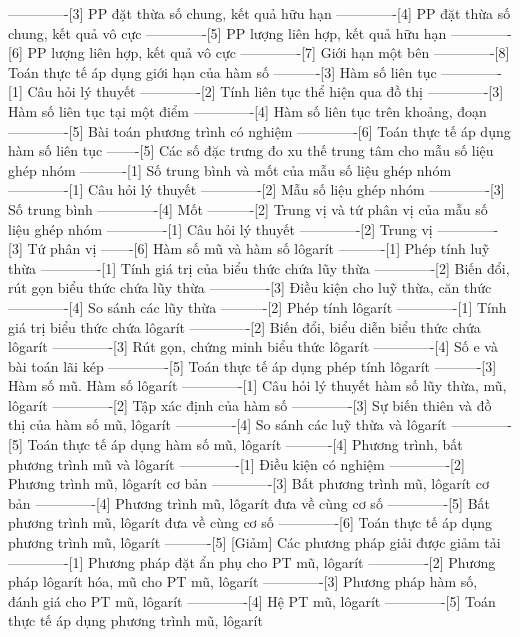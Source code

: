 -------------[3] PP đặt thừa số chung, kết quả hữu hạn
-------------[4] PP đặt thừa số chung, kết quả vô cực
-------------[5] PP lượng liên hợp, kết quả hữu hạn
-------------[6] PP lượng liên hợp, kết quả vô cực
-------------[7] Giới hạn một bên
-------------[8] Toán thực tế áp dụng giới hạn của hàm số
----------[3] Hàm số liên tục
-------------[1] Câu hỏi lý thuyết
-------------[2] Tính liên tục thể hiện qua đồ thị
-------------[3] Hàm số liên tục tại một điểm
-------------[4] Hàm số liên tục trên khoảng, đoạn
-------------[5] Bài toán phương trình có nghiệm
-------------[6] Toán thực tế áp dụng hàm số liên tục
-------[5] Các số đặc trưng đo xu thế trung tâm cho mẫu số liệu ghép nhóm
----------[1] Số trung bình và mốt của mẫu số liệu ghép nhóm
-------------[1] Câu hỏi lý thuyết
-------------[2] Mẫu số liệu ghép nhóm
-------------[3] Số trung bình
-------------[4] Mốt
----------[2] Trung vị và tứ phân vị của mẫu số liệu ghép nhóm
-------------[1] Câu hỏi lý thuyết
-------------[2] Trung vị
-------------[3] Tứ phân vị
-------[6] Hàm số mũ và hàm số lôgarít
----------[1] Phép tính luỹ thừa
-------------[1] Tính giá trị của biểu thức chứa lũy thừa
-------------[2] Biến đổi, rút gọn biểu thức chứa lũy thừa
-------------[3] Điều kiện cho luỹ thừa, căn thức
-------------[4] So sánh các lũy thừa
----------[2] Phép tính lôgarít
-------------[1] Tính giá trị biểu thức chứa lôgarít
-------------[2] Biến đổi, biểu diễn biểu thức chứa lôgarít
-------------[3] Rút gọn, chứng minh biểu thức lôgarít
-------------[4] Số e và bài toán lãi kép
-------------[5] Toán thực tế áp dụng phép tính lôgarít
----------[3] Hàm số mũ. Hàm số lôgarít
-------------[1] Câu hỏi lý thuyết hàm số lũy thừa, mũ, lôgarít
-------------[2] Tập xác định của hàm số
-------------[3] Sự biến thiên và đồ thị của hàm số mũ, lôgarít
-------------[4] So sánh các luỹ thừa và lôgarít
-------------[5] Toán thực tế áp dụng hàm số mũ, lôgarít
----------[4] Phương trình, bất phương trình mũ và lôgarít
-------------[1] Điều kiện có nghiệm
-------------[2] Phương trình mũ, lôgarít cơ bản
-------------[3] Bất phương trình mũ, lôgarít cơ bản
-------------[4] Phương trình mũ, lôgarít đưa về cùng cơ số
-------------[5] Bất phương trình mũ, lôgarít đưa về cùng cơ số
-------------[6] Toán thực tế áp dụng phương trình mũ, lôgarít
----------[5] [Giảm] Các phương pháp giải được giảm tải
-------------[1] Phương pháp đặt ẩn phụ cho PT mũ, lôgarít
-------------[2] Phương pháp lôgarít hóa, mũ cho PT mũ, lôgarít
-------------[3] Phương pháp hàm số, đánh giá cho PT mũ, lôgarít
-------------[4] Hệ PT mũ, lôgarít
-------------[5] Toán thực tế áp dụng phương trình mũ, lôgarít
